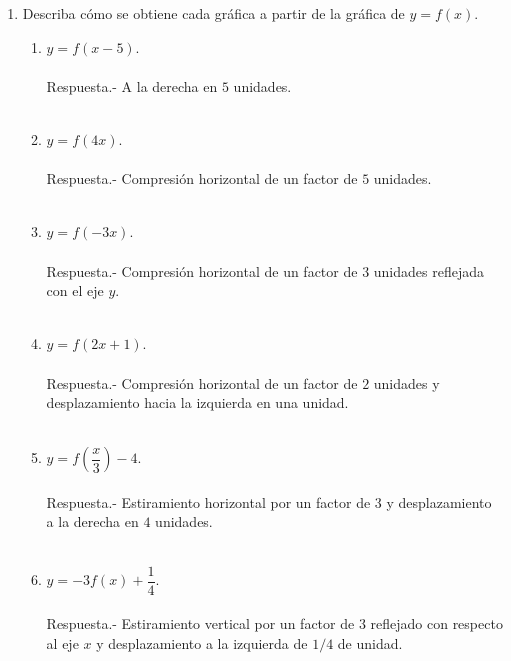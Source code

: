 \begin{enumerate}[\bfseries 1.]
\begin{enumerate}[\bfseries a)]
\end{enumerate}

\item Describa cómo se obtiene cada gráfica a partir de la gráfica de $y=f(x)$.\\
\begin{enumerate}[\bfseries a)]

    \item $y=f(x-5)$.\\\\
	Respuesta.-\; A la derecha en $5$ unidades.\\\\

    \item $y=f(4x)$.\\\\
	Respuesta.-\; Compresión horizontal  de un factor de $5$ unidades.\\\\

    \item $y=f(-3x)$.\\\\ 
	Respuesta.-\; Compresión horizontal de un factor de $3$ unidades reflejada con el eje $y$.\\\\

    \item $y=f(2x+1)$.\\\\ 
	Respuesta.-\; Compresión horizontal de un factor de $2$ unidades y desplazamiento hacia la izquierda en una unidad.\\\\

    \item $y=f\left(\dfrac{x}{3}\right) - 4$.\\\\ 
	Respuesta.-\; Estiramiento horizontal por un factor de $3$ y desplazamiento a la derecha en $4$ unidades. \\\\
 
    \item $y = -3f(x) + \dfrac{1}{4}$.\\\\   
	Respuesta.-\; Estiramiento vertical por un factor de $3$ reflejado con respecto al eje $x$ y desplazamiento a la izquierda de $1/4$ de unidad.\\\\


\end{enumerate}
\end{enumerate}
